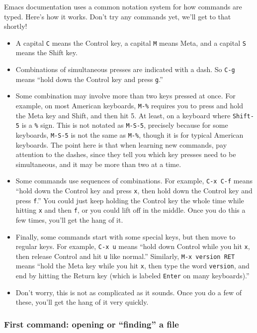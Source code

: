 \documentclass{article}
\begin{document}
Emacs documentation uses a common notation system for how commands are typed.  Here's how it works. Don't try any commands yet, we'll get to that shortly!  
\begin{itemize}
\item A capital \texttt{C} means the Control key, a capital \texttt{M} means Meta, and a capital \texttt{S} means the Shift key.
\item Combinations of simultaneous presses are indicated with a dash.  So \texttt{C-g} means ``hold down the Control key and press \texttt{g}.''
\item Some combination may involve more than two keys pressed at once.  For example, on most American keyboards, \texttt{M-\%} requires you to press and hold the Meta key and Shift, and then hit 5.  At least, on a keyboard where \texttt{Shift-5} is a \texttt{\%} sign. This is not notated as \texttt{M-S-5}, precisely because for some keyboards, \texttt{M-S-5} is not the same as \texttt{M-\%}, though it is for typical American keyboards. The point here is that when learning new commands, pay attention to the dashes, since they tell you which key presses need to be simultaneous, and it may be more than two at a time.
\item Some commands use sequences of combinations. For example, \texttt{C-x C-f} means ``hold down the Control key and press \texttt{x}, then hold down the Control key and press \texttt{f}.''  You could just keep holding the Control key the whole time while hitting \texttt{x} and then \texttt{f}, or you could lift off in the middle.  Once you do this a few times, you'll get the hang of it.
\item Finally, some commands start with some special keys, but then move to regular keys. For example, \texttt{C-x u} means ``hold down Control while you hit \texttt{x}, then release Control and hit \texttt{u} like normal.''  Similarly, \texttt{M-x version RET} means ``hold the Meta key while you hit \texttt{x}, then type the word \texttt{version}, and end by hitting the Return key (which is labeled \texttt{Enter} on many keyboards).''
\item Don't worry, this is not as complicated as it sounds.  Once you do a few of these, you'll get the hang of it very quickly.
\end{itemize}
\subsubsection{First command: opening or ``finding'' a file}
\label{sec-4-2-2}
\end{document}
